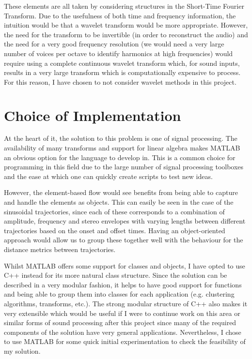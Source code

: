 \documentclass[12pt,a4paper,twoside,openright]{report}
\begin{document}


These elements are all taken by considering structures in the Short-Time Fourier Transform. Due to the usefulness of both time and frequency information, the intuition would be that a wavelet transform would be more appropriate. However, the need for the transform to be invertible (in order to reconstruct the audio) and the need for a very good frequency resolution (we would need a very large number of voices per octave to identify harmonics at high frequencies) would require using a complete continuous wavelet transform which, for sound inputs, results in a very large transform which is computationally expensive to process. For this reason, I have chosen to not consider wavelet methods in this project.

\section{Choice of Implementation}

At the heart of it, the solution to this problem is one of signal processing. The availability of many transforms and support for linear algebra makes MATLAB an obvious option for the language to develop in. This is a common choice for programming in this field due to the large number of signal processing toolboxes and the ease at which one can quickly create scripts to test new ideas.

However, the element-based flow would see benefits from being able to capture and handle the elements as objects. This can easily be seen in the case of the sinusoidal trajectories, since each of these corresponds to a combination of amplitude, frequency and stereo envelopes with varying lengths between different trajectories based on the onset and offset times. Having an object-oriented approach would allow us to group these together well with the behaviour for the distance metrics between trajectories.

Whilst MATLAB offers some support for classes and objects, I have opted to use C++ instead for its more natural class structure. Since the solution can be described in a very modular fashion, it helps to have good support for functions and being able to group them into classes for each application (e.g. clustering algorithms, transforms, etc.). The strong modular structure of C++ also makes it very extensible which would be useful if I were to continue work on this area or similar forms of sound processing after this project since many of the required components of the solution have very general applications. Nevertheless, I chose to use MATLAB for some quick initial experimentation to check the feasibility of my solution.
\end{document}
